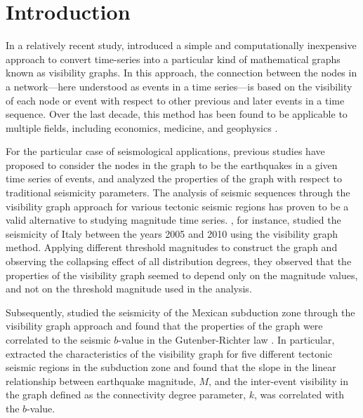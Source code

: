 
\section{Introduction}

In a relatively recent study, \citet{Lacasa2008} introduced a simple and computationally inexpensive approach to convert time-series into a particular kind of mathematical graphs known as visibility graphs. In this approach, the connection between the nodes in a network---here understood as events in a time series---is based on the visibility of each node or event with respect to other previous and later events in a time sequence. Over the last decade, this method has been found to be applicable to multiple fields, including economics, medicine, and geophysics \citep[e.g.,][]{Yang_2009_PA, Elsner_2009_GRL, Telesca2012_CSF, Wang2012, Long2013}.

For the particular case of seismological applications, previous studies have proposed to consider the nodes in the graph to be the earthquakes in a given time series of events, and analyzed the properties of the graph with respect to traditional seismicity parameters. The analysis of seismic sequences through the visibility graph approach for various tectonic seismic regions has proven to be a valid alternative to studying magnitude time series. \citet{Telesca2012}, for instance, studied the seismicity of Italy between the years 2005 and 2010 using the visibility graph method. Applying different threshold magnitudes to construct the graph and observing the collapsing effect of all distribution degrees, they observed that the properties of the visibility graph seemed to depend only on the magnitude values, and not on the threshold magnitude used in the analysis. 

Subsequently, \citet{Telesca2013} studied the seismicity of the Mexican subduction zone through the visibility graph approach and found that the properties of the graph were correlated to the seismic $b$-value in the Gutenber-Richter law \citep{Gutenberg1944}. In particular, \citet{Telesca2013} extracted the characteristics of the visibility graph for five different tectonic seismic regions in the subduction zone and found that the slope in the linear relationship between earthquake magnitude, $M$, and the inter-event visibility in the graph defined as the connectivity degree parameter, $k$, was correlated with the $b$-value.

